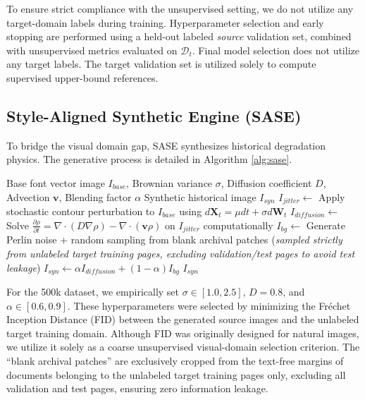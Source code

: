 \documentclass[pdflatex,sn-mathphys-num]{sn-jnl}
\begin{document}
To ensure strict compliance with the unsupervised setting, we do not utilize any target-domain labels during training. Hyperparameter selection and early stopping are performed using a held-out labeled \textit{source} validation set, combined with unsupervised metrics evaluated on $\mathcal{D}_t$. Final model selection does not utilize any target labels. The target validation set is utilized solely to compute supervised upper-bound references.

\subsection{Style-Aligned Synthetic Engine (SASE)}
To bridge the visual domain gap, SASE synthesizes historical degradation physics. The generative process is detailed in Algorithm \ref{alg:sase}.

\begin{algorithm}[h]
\caption{SASE: Physics-Based Data Generation}
\label{alg:sase}
\begin{algorithmic}[1]
\Require Base font vector image $I_{base}$, Brownian variance $\sigma$, Diffusion coefficient $D$, Advection $\mathbf{v}$, Blending factor $\alpha$
\Ensure Synthetic historical image $I_{syn}$
\State $I_{jitter} \leftarrow$ Apply stochastic contour perturbation to $I_{base}$ using $d\mathbf{X}_t = \mu dt + \sigma d\mathbf{W}_t$
\State $I_{diffusion} \leftarrow$ Solve $\frac{\partial \rho}{\partial t} = \nabla \cdot (D \nabla \rho) - \nabla \cdot (\mathbf{v} \rho)$ on $I_{jitter}$ computationally
\State $I_{bg} \leftarrow$ Generate Perlin noise + random sampling from blank archival patches (\textit{sampled strictly from unlabeled target training pages, excluding validation/test pages to avoid test leakage})
\State $I_{syn} \leftarrow \alpha I_{diffusion} + (1-\alpha) I_{bg}$
\State \Return $I_{syn}$
\end{algorithmic}
\end{algorithm}

For the 500k dataset, we empirically set $\sigma \in [1.0, 2.5]$, $D=0.8$, and $\alpha \in [0.6, 0.9]$. These hyperparameters were selected by minimizing the Fr\'echet Inception Distance (FID) between the generated source images and the unlabeled target training domain. Although FID was originally designed for natural images, we utilize it solely as a coarse unsupervised visual-domain selection criterion. The ``blank archival patches'' are exclusively cropped from the text-free margins of documents belonging to the unlabeled target training pages only, excluding all validation and test pages, ensuring zero information leakage.
\end{document}
